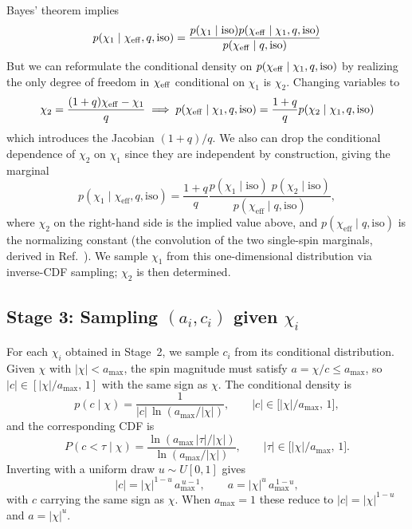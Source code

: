 \documentclass[%
 reprint,
 amsmath,amssymb,
 aps,
 onecolumn,
 nofootinbib,nobibnotes,
]{revtex4-2}
\begin{document}
Bayes' theorem implies
\begin{equation}
    p(\chi_1 \mid \chi_{\rm eff}, q, \mathrm{iso}) = \frac{p(\chi_1\mid\mathrm{iso}) p(\chi_{\rm eff} \mid\chi_1, q, \mathrm{iso})}{p(\chi_{\rm eff}\mid q, \mathrm{iso})}
\end{equation}
But we can reformulate the conditional density on $p(\chi_{\rm eff} \mid\chi_1, q, \mathrm{iso})$ by realizing the only degree of freedom in $\chi_{\rm eff}$ conditional on $\chi_1$ is $\chi_2$. Changing variables to
\begin{equation}
    \chi_2 = \frac{(1+q)\chi_\mathrm{eff} - \chi_1}{q} \implies p(\chi_{\rm eff} \mid\chi_1, q, \mathrm{iso}) = \frac{1+q}{q}p(\chi_2 \mid \chi_1, q, \mathrm{iso})
\end{equation}
which introduces the Jacobian $(1+q)/q$. We also can drop the conditional dependence of $\chi_2$ on $\chi_1$ since they are independent by construction, giving the marginal
\begin{equation}
    p(\chi_1 \mid \chi_\mathrm{eff}, q, \mathrm{iso})
    = \frac{1+q}{q}
      \frac{p(\chi_1\mid\mathrm{iso})\;p(\chi_2\mid\mathrm{iso})}
           {p(\chi_\mathrm{eff}\mid q,\mathrm{iso})},
\end{equation}
where $\chi_2$ on the right-hand side is the implied value above,
and $p(\chi_\mathrm{eff}\mid q,\mathrm{iso})$ is the normalizing constant
(the convolution of the two single-spin marginals, derived in Ref.~\cite{Callister:2021gxf}). 
We sample $\chi_1$ from this one-dimensional distribution via inverse-CDF
sampling; $\chi_2$ is then determined.

\subsection{Stage 3: Sampling $(a_i, c_i)$ given $\chi_i$}

For each $\chi_i$ obtained in Stage~2, we sample $c_i$ from its conditional
distribution.  Given $\chi$ with $|\chi|<a_{\max}$, the spin magnitude must
satisfy $a = \chi/c \leq a_{\max}$, so $|c| \in [|\chi|/a_{\max},\,1]$ with the
same sign as $\chi$.  The conditional density is
\begin{equation}
    p(c\mid\chi) = \frac{1}{|c|\,\ln(a_{\max}/|\chi|)},
    \qquad |c|\in\bigl[|\chi|/a_{\max},\,1\bigr],
\end{equation}
and the corresponding CDF is
\begin{equation}
    P(c < \tau \mid \chi) = \frac{\ln\!\left(a_{\max}\,|\tau|/|\chi|\right)}
                                  {\ln\!\left(a_{\max}/|\chi|\right)},
    \qquad |\tau|\in\bigl[|\chi|/a_{\max},\,1\bigr].
\end{equation}
Inverting with a uniform draw $u\sim U[0,1]$ gives
\begin{equation}
    |c| = |\chi|^{1-u}\,a_{\max}^{\,u-1}, \qquad a = |\chi|^{u}\,a_{\max}^{\,1-u},
\end{equation}
with $c$ carrying the same sign as $\chi$.  When $a_{\max}=1$ these reduce to
$|c|=|\chi|^{1-u}$ and $a=|\chi|^u$.
\end{document}
